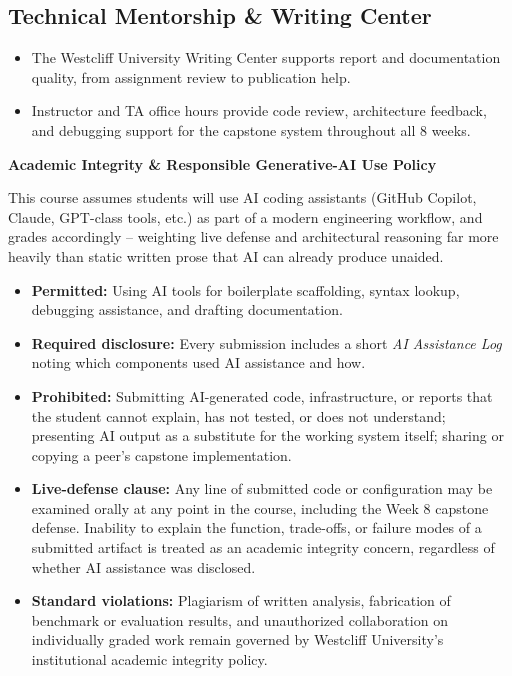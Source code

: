 \documentclass[10pt, a4paper]{article}
\newcommand{\sectionbar}[1]{%
  \par\vspace{0.7em}
  \refstepcounter{section}%
  \noindent\colorbox{secondary}{\parbox{\dimexpr\textwidth-2\fboxsep\relax}{\centering\color{white}\bfseries\Large #1}}%
  \par\vspace{0.5em}
}
\begin{document}
\subsection*{Technical Mentorship \& Writing Center}
\begin{itemize}
    \item The Westcliff University Writing Center supports report and documentation quality, from assignment review to publication help.
    \item Instructor and TA office hours provide code review, architecture feedback, and debugging support for the capstone system throughout all 8 weeks.
\end{itemize}

\sectionbar{Academic Integrity \& Responsible Generative-AI Use Policy}
\label{sec:ai-policy}
This course assumes students will use AI coding assistants (GitHub Copilot, Claude, GPT-class tools, etc.) as part of a modern engineering workflow, and grades accordingly -- weighting live defense and architectural reasoning far more heavily than static written prose that AI can already produce unaided.

\begin{itemize}
    \item \textbf{Permitted:} Using AI tools for boilerplate scaffolding, syntax lookup, debugging assistance, and drafting documentation.
    \item \textbf{Required disclosure:} Every submission includes a short \textit{AI Assistance Log} noting which components used AI assistance and how.
    \item \textbf{Prohibited:} Submitting AI-generated code, infrastructure, or reports that the student cannot explain, has not tested, or does not understand; presenting AI output as a substitute for the working system itself; sharing or copying a peer's capstone implementation.
    \item \textbf{Live-defense clause:} Any line of submitted code or configuration may be examined orally at any point in the course, including the Week 8 capstone defense. Inability to explain the function, trade-offs, or failure modes of a submitted artifact is treated as an academic integrity concern, regardless of whether AI assistance was disclosed.
    \item \textbf{Standard violations:} Plagiarism of written analysis, fabrication of benchmark or evaluation results, and unauthorized collaboration on individually graded work remain governed by Westcliff University's institutional academic integrity policy.
\end{itemize}
\end{document}

